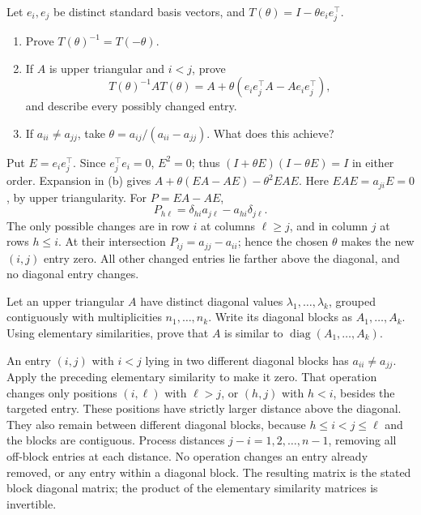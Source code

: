\begin{problem}\label{ex:08:elementary-similarity}
Let \(e_i,e_j\) be distinct standard basis vectors, and
\(T(\theta)=I-\theta e_ie_j^\top\).
\begin{enumerate}
\item Prove \(T(\theta)^{-1}=T(-\theta)\).
\item If \(A\) is upper triangular and \(i<j\), prove
\[
 T(\theta)^{-1}AT(\theta)=A+\theta(e_ie_j^\top A-Ae_ie_j^\top),
\]
and describe every possibly changed entry.
\item If \(a_{ii}\ne a_{jj}\), take
\(\theta=a_{ij}/(a_{ii}-a_{jj})\). What does this achieve?
\end{enumerate}
\end{problem}
\begin{solution}
Put \(E=e_ie_j^\top\). Since \(e_j^\top e_i=0\), \(E^2=0\);
thus \((I+\theta E)(I-\theta E)=I\) in either order.
Expansion in (b) gives \(A+\theta(EA-AE)-\theta^2EAE\).
Here \(EAE=a_{ji}E=0\), by upper triangularity.
For \(P=EA-AE\),
\[
 P_{h\ell}=\delta_{hi}a_{j\ell}-a_{hi}\delta_{j\ell}.
\]
The only possible changes are in row \(i\) at columns \(\ell\geqslant j\),
and in column \(j\) at rows \(h\leqslant i\).
At their intersection \(P_{ij}=a_{jj}-a_{ii}\); hence the chosen
\(\theta\) makes the new \((i,j)\) entry zero.
All other changed entries lie farther above the diagonal, and no
diagonal entry changes.
\end{solution}

\begin{problem}\label{ex:08:block-separation}
Let an upper triangular \(A\) have distinct diagonal values
\(\lambda_1,\ldots,\lambda_k\), grouped contiguously with multiplicities
\(n_1,\ldots,n_k\). Write its diagonal blocks as \(A_1,\ldots,A_k\).
Using elementary similarities, prove that \(A\) is similar to
\(\operatorname{diag}(A_1,\ldots,A_k)\).
\end{problem}
\begin{solution}
An entry \((i,j)\) with \(i<j\) lying in two different diagonal blocks
has \(a_{ii}\ne a_{jj}\). Apply the preceding elementary similarity to
make it zero. That operation changes only positions \((i,\ell)\) with
\(\ell>j\), or \((h,j)\) with \(h<i\), besides the targeted entry.
These positions have strictly larger distance above the diagonal.
They also remain between different diagonal blocks, because
\(h\leqslant i<j\leqslant\ell\) and the blocks are contiguous.
Process distances \(j-i=1,2,\ldots,n-1\), removing all off-block
entries at each distance. No operation changes an entry already removed,
or any entry within a diagonal block. The resulting matrix is the
stated block diagonal matrix; the product of the elementary similarity
matrices is invertible.
\end{solution}

